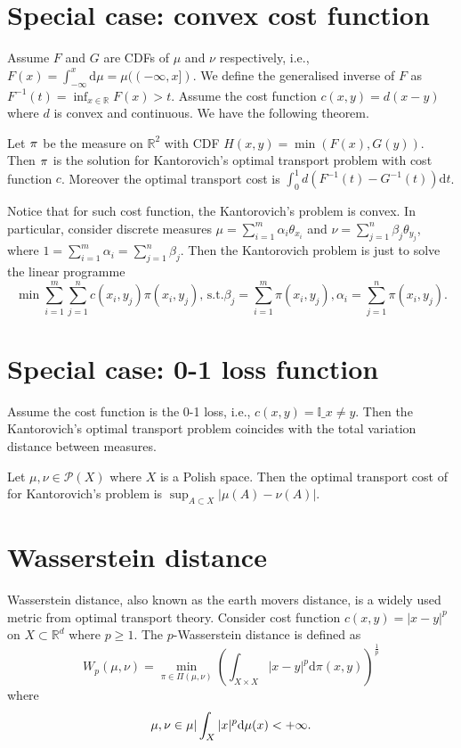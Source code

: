 \documentclass[a4paper,11pt]{article}
\begin{document}
\section*{Special case: convex cost function}
Assume $F$ and $G$ are CDFs of $\mu$ and $\nu$ respectively, i.e., $F(x) = \int_{-\infty}^{x}\mathrm{d}\mu = \mu((-\infty, x])$. We define the generalised inverse of $F$ as $F^{-1}(t) = \inf_{x \in \mathbb{R}} F(x) > t$. Assume the cost function $c(x, y) = d(x - y)$ where $d$ is convex and continuous. We have the following theorem.

\begin{theorem}
Let $\pi^{\*}$ be the measure on $\mathbb{R}^2$ with CDF $H(x, y) = \min (F(x), G(y))$. Then $\pi^{\*}$ is the solution for Kantorovich's optimal transport problem with cost function $c$. Moreover the optimal transport cost is $\int_0^1 d(F^{-1}(t) - G^{-1}(t)) \mathrm{d}t$.
\end{theorem}

Notice that for such cost function, the Kantorovich's problem is convex. In particular, consider discrete measures $\mu = \sum_{i=1}^{m}\alpha_i \theta_{x_i}$ and $\nu = \sum_{j=1}^{n}\beta_j \theta_{y_j}$, where $1 = \sum_{i=1}^{m}\alpha_i = \sum_{j=1}^{n}\beta_j$. Then the Kantorovich problem is just to solve the linear programme
\begin{equation}
\min \sum_{i=1}^{m}\sum_{j=1}^{n}c(x_i, y_j)\pi(x_i, y_j) \textrm{, s.t.} \beta_j = \sum_{i=1}^{m}\pi(x_i, y_j), \alpha_i = \sum_{j=1}^{n}\pi(x_i, y_j).
\end{equation}

\section*{Special case: 0-1 loss function}
Assume the cost function is the 0-1 loss, i.e., $c(x, y) = \mathbb{I}\_{x \ne y}$. Then the Kantorovich's optimal transport problem coincides with the total variation distance between measures.

\begin{theorem}
Let $\mu, \nu \in \mathcal{P}(X)$ where $X$ is a Polish space. Then the optimal transport cost of for Kantorovich's problem is $\sup_{A \subset X} |\mu(A) - \nu(A)|$.
\end{theorem}

\section*{Wasserstein distance}
Wasserstein distance, also known as the earth movers distance, is a widely used metric from optimal transport theory. Consider cost function $c(x, y) = |x - y|^p$ on $X \subset \mathbb{R}^d$ where $p \ge 1$. The $p$-Wasserstein distance is defined as 
\begin{equation}
W_p(\mu, \nu) = \min_{\pi \in \Pi(\mu, \nu)} (\int_{X \times X} |x - y|^p \mathrm{d}\pi(x, y))^{\frac{1}{p}}
\end{equation}
where 
\begin{equation}
\mu, \nu \in \\{\mu | \int_X |x|^p\mathrm{d}\mu(x) < +\infty\\}.
\end{equation}
\end{document}
